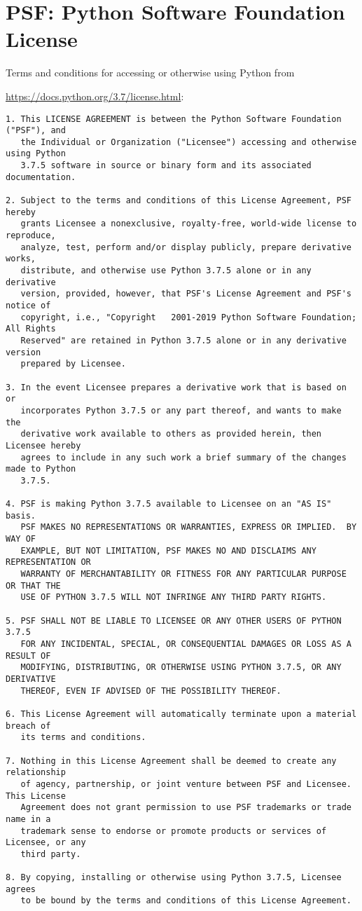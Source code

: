 \section{PSF: Python Software Foundation License}

Terms and conditions for accessing or otherwise using Python from


\url{https://docs.python.org/3.7/license.html}:

\scriptsize
\begin{verbatim}
1. This LICENSE AGREEMENT is between the Python Software Foundation ("PSF"), and
   the Individual or Organization ("Licensee") accessing and otherwise using Python
   3.7.5 software in source or binary form and its associated documentation.

2. Subject to the terms and conditions of this License Agreement, PSF hereby
   grants Licensee a nonexclusive, royalty-free, world-wide license to reproduce,
   analyze, test, perform and/or display publicly, prepare derivative works,
   distribute, and otherwise use Python 3.7.5 alone or in any derivative
   version, provided, however, that PSF's License Agreement and PSF's notice of
   copyright, i.e., "Copyright   2001-2019 Python Software Foundation; All Rights
   Reserved" are retained in Python 3.7.5 alone or in any derivative version
   prepared by Licensee.

3. In the event Licensee prepares a derivative work that is based on or
   incorporates Python 3.7.5 or any part thereof, and wants to make the
   derivative work available to others as provided herein, then Licensee hereby
   agrees to include in any such work a brief summary of the changes made to Python
   3.7.5.

4. PSF is making Python 3.7.5 available to Licensee on an "AS IS" basis.
   PSF MAKES NO REPRESENTATIONS OR WARRANTIES, EXPRESS OR IMPLIED.  BY WAY OF
   EXAMPLE, BUT NOT LIMITATION, PSF MAKES NO AND DISCLAIMS ANY REPRESENTATION OR
   WARRANTY OF MERCHANTABILITY OR FITNESS FOR ANY PARTICULAR PURPOSE OR THAT THE
   USE OF PYTHON 3.7.5 WILL NOT INFRINGE ANY THIRD PARTY RIGHTS.

5. PSF SHALL NOT BE LIABLE TO LICENSEE OR ANY OTHER USERS OF PYTHON 3.7.5
   FOR ANY INCIDENTAL, SPECIAL, OR CONSEQUENTIAL DAMAGES OR LOSS AS A RESULT OF
   MODIFYING, DISTRIBUTING, OR OTHERWISE USING PYTHON 3.7.5, OR ANY DERIVATIVE
   THEREOF, EVEN IF ADVISED OF THE POSSIBILITY THEREOF.

6. This License Agreement will automatically terminate upon a material breach of
   its terms and conditions.

7. Nothing in this License Agreement shall be deemed to create any relationship
   of agency, partnership, or joint venture between PSF and Licensee.  This License
   Agreement does not grant permission to use PSF trademarks or trade name in a
   trademark sense to endorse or promote products or services of Licensee, or any
   third party.

8. By copying, installing or otherwise using Python 3.7.5, Licensee agrees
   to be bound by the terms and conditions of this License Agreement.
\end{verbatim}
\normalsize

\label{lastpagea}
